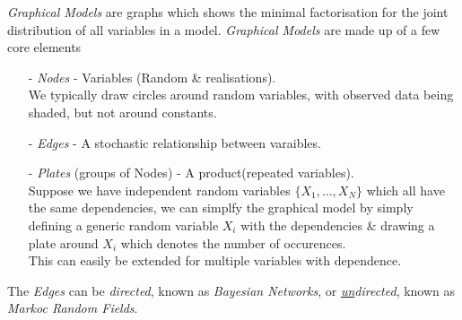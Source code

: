 \documentclass[11pt,a4paper]{article}
\begin{document}
\textit{Graphical Models} are graphs which shows the minimal factorisation for the joint distribution of all variables in a model. \textit{Graphical Models} are made up of a few core elements
\begin{itemize}
	\item[-] \textit{Nodes} - Variables (Random \& realisations).\\
	\nb We typically draw circles around random variables, with observed data being shaded, but not around constants.
	\item[-] \textit{Edges} - A stochastic relationship between varaibles.
	\item[-] \textit{Plates} (\ie groups of Nodes) - A product(\ie repeated variables).\\
	\ie Suppose we have independent random variables $\{X_1,\dots,X_N\}$ which all have the same dependencies, we can simplfy the graphical model by simply defining a generic random variable $X_i$ with the dependencies \& drawing a plate around $X_i$ which denotes the number of occurences.\\
	This can easily be extended for multiple variables with dependence.
\end{itemize}
The \textit{Edges} can be \textit{directed}, known as \textit{Bayesian Networks}, or \textit{\underline{un}directed}, known as \textit{Markoc Random Fields}.\\
\end{document}
